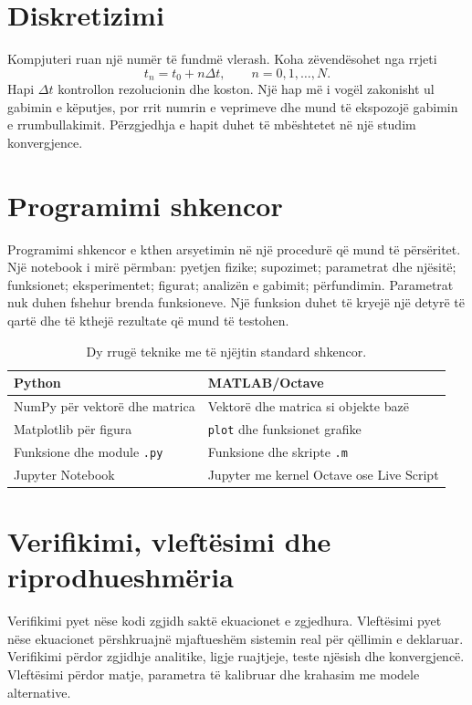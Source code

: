 \section{Diskretizimi}
Kompjuteri ruan një numër të fundmë vlerash. Koha zëvendësohet nga rrjeti
\begin{equation}
 t_n=t_0+n\Delta t,\qquad n=0,1,\ldots,N.
\end{equation}
Hapi $\Delta t$ kontrollon rezolucionin dhe koston. Një hap më i vogël zakonisht ul gabimin e këputjes, por rrit numrin e veprimeve dhe mund të ekspozojë gabimin e rrumbullakimit. Përzgjedhja e hapit duhet të mbështetet në një studim konvergjence.

\section{Programimi shkencor}
Programimi shkencor e kthen arsyetimin në një procedurë që mund të përsëritet. Një notebook i mirë përmban: pyetjen fizike; supozimet; parametrat dhe njësitë; funksionet; eksperimentet; figurat; analizën e gabimit; përfundimin. Parametrat nuk duhen fshehur brenda funksioneve. Një funksion duhet të kryejë një detyrë të qartë dhe të kthejë rezultate që mund të testohen.

\begin{table}[ht]
\centering
\caption{Dy rrugë teknike me të njëjtin standard shkencor.}
\begin{tabularx}{\textwidth}{YY}
\toprule Python & MATLAB/Octave\\ \midrule
NumPy për vektorë dhe matrica & Vektorë dhe matrica si objekte bazë\\
Matplotlib për figura & \texttt{plot} dhe funksionet grafike\\
Funksione dhe module \texttt{.py} & Funksione dhe skripte \texttt{.m}\\
Jupyter Notebook & Jupyter me kernel Octave ose Live Script\\
\bottomrule
\end{tabularx}
\end{table}

\section{Verifikimi, vleftësimi dhe riprodhueshmëria}
Verifikimi pyet nëse kodi zgjidh saktë ekuacionet e zgjedhura. Vleftësimi pyet nëse ekuacionet përshkruajnë mjaftueshëm sistemin real për qëllimin e deklaruar. Verifikimi përdor zgjidhje analitike, ligje ruajtjeje, teste njësish dhe konvergjencë. Vleftësimi përdor matje, parametra të kalibruar dhe krahasim me modele alternative.

